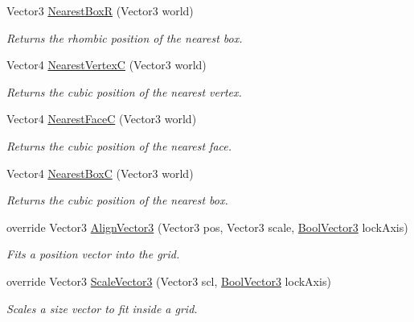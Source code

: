 \begin{DoxyCompactItemize}
Vector3 \hyperlink{class_g_f_hex_grid_aa6a007fdbe6772fe4df1c906b2cdb47f_aa6a007fdbe6772fe4df1c906b2cdb47f}{Nearest\+Box\+R} (Vector3 world)
\begin{DoxyCompactList}\small\item\em Returns the rhombic position of the nearest box.\end{DoxyCompactList}\item 
Vector4 \hyperlink{class_g_f_hex_grid_aa5d236ca39c81d71f7f088dda68c9aa5_aa5d236ca39c81d71f7f088dda68c9aa5}{Nearest\+Vertex\+C} (Vector3 world)
\begin{DoxyCompactList}\small\item\em Returns the cubic position of the nearest vertex.\end{DoxyCompactList}\item 
Vector4 \hyperlink{class_g_f_hex_grid_ac70e0c7e710fbc3ed4748911eded9bf0_ac70e0c7e710fbc3ed4748911eded9bf0}{Nearest\+Face\+C} (Vector3 world)
\begin{DoxyCompactList}\small\item\em Returns the cubic position of the nearest face.\end{DoxyCompactList}\item 
Vector4 \hyperlink{class_g_f_hex_grid_a8901857400ef5fb8673a2b6ca5aaa52d_a8901857400ef5fb8673a2b6ca5aaa52d}{Nearest\+Box\+C} (Vector3 world)
\begin{DoxyCompactList}\small\item\em Returns the cubic position of the nearest box.\end{DoxyCompactList}\item 
override Vector3 \hyperlink{class_g_f_hex_grid_a2d51f41dc859b4957bb67a518c252632_a2d51f41dc859b4957bb67a518c252632}{Align\+Vector3} (Vector3 pos, Vector3 scale, \hyperlink{class_grid_framework_1_1_vectors_1_1_bool_vector3}{Bool\+Vector3} lock\+Axis)
\begin{DoxyCompactList}\small\item\em Fits a position vector into the grid.\end{DoxyCompactList}\item 
override Vector3 \hyperlink{class_g_f_hex_grid_a534e73e65f65a117ebb6f4e1122f097d_a534e73e65f65a117ebb6f4e1122f097d}{Scale\+Vector3} (Vector3 scl, \hyperlink{class_grid_framework_1_1_vectors_1_1_bool_vector3}{Bool\+Vector3} lock\+Axis)
\begin{DoxyCompactList}\small\item\em Scales a size vector to fit inside a grid.\end{DoxyCompactList}\end{DoxyCompactItemize}
